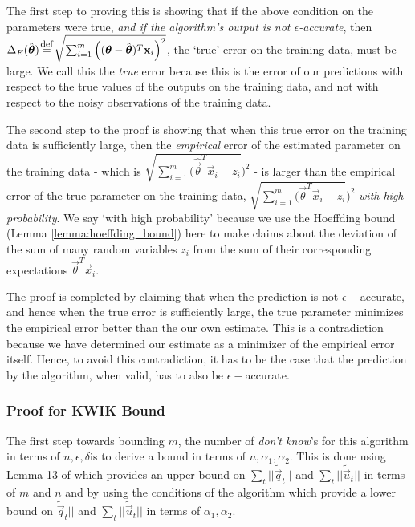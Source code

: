 The first step to proving this is showing that if the above condition on the parameters were true, \textit{and if the algorithm's output is not $\epsilon$-accurate}, then $\Delta_{E}(\hat{\vec{\theta}}) \defeq \sqrt{ \sum_{i=1}^{m} \left((\vec{\theta} - \hat{\vec{\theta}}) ^T \vec{x}_i \right)^2}$, the `true' error on the training data, must be large. We call this the \textit{true} error because this is the error of our predictions with respect to the true values of the outputs on the training data, and not with respect to the noisy observations of the training data. 

The second step to the proof is showing that when this true error on the training data is  sufficiently large, then the \textit{empirical} error of the estimated parameter on the training data - which is $\sqrt{\sum_{i=1}^{m} (\hat{\vec{\theta}}  ^T \vec{x}_i - z_i})^2 $ - is larger than the empirical error of the true parameter on the training data,  $\sqrt{\sum_{i=1}^{m} (\vec{\theta}  ^T \vec{x}_i - z_i})^2 $ \textit{with high probability}. We say `with high probability' because we use the Hoeffding bound (Lemma \ref{lemma:hoeffding_bound}) here to make claims about the deviation of the sum of many random variables $z_i$ from the sum of their corresponding expectations $\vec{\theta}^T \vec{x}_i$. 

The proof is completed by claiming that when the prediction is not $\epsilon-$accurate, and hence when the true error is sufficiently large, the true parameter minimizes the empirical error better than the our own estimate. This is a contradiction because we have determined our estimate as a minimizer of the empirical error itself. Hence, to avoid this contradiction, it has to be the case that the prediction by the algorithm, when valid, has to also be $\epsilon-$accurate.\\ 

\subsubsection{Proof for KWIK Bound}
The first step towards bounding $m$, the number of \textit{don't know}'s for this algorithm in terms of $n, \epsilon, \delta $is to derive a bound in terms of $n, \alpha_1, \alpha_2$. This is done using Lemma 13 of \citet{DBLP:journals/jmlr/Auer02} which provides an upper bound on $\sum_t ||\tilde{\vec{q}}_t||$ and $\sum_t ||\tilde{\vec{u}}_t||$ in terms of $m$ and $n$ and by using the conditions of the algorithm which provide a lower bound on 	$\tilde{\vec{q}}_t||$ and $\sum_t ||\tilde{\vec{u}}_t||$  in terms of $\alpha_1, \alpha_2$. 

